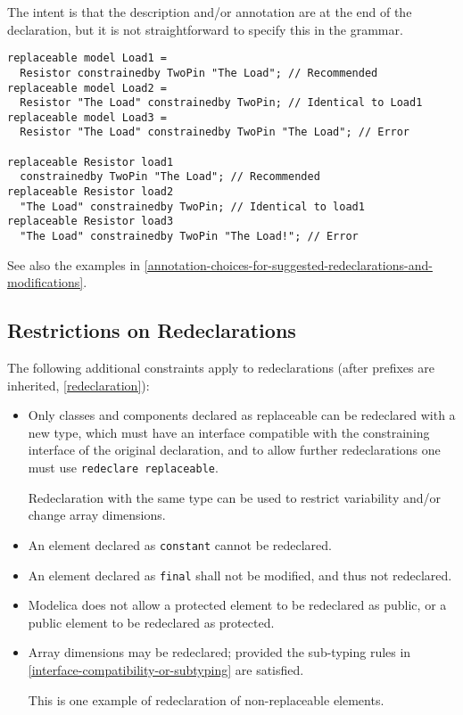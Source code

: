 \begin{nonnormative}
The intent is that the description and/or annotation are at the end of the declaration, but it is not straightforward to specify this in the grammar.
\end{nonnormative}

\begin{example}
\begin{lstlisting}[language=modelica]
replaceable model Load1 =
  Resistor constrainedby TwoPin "The Load"; // Recommended
replaceable model Load2 =
  Resistor "The Load" constrainedby TwoPin; // Identical to Load1
replaceable model Load3 =
  Resistor "The Load" constrainedby TwoPin "The Load"; // Error

replaceable Resistor load1
  constrainedby TwoPin "The Load"; // Recommended
replaceable Resistor load2
  "The Load" constrainedby TwoPin; // Identical to load1
replaceable Resistor load3
  "The Load" constrainedby TwoPin "The Load!"; // Error
\end{lstlisting}
\end{example}

See also the examples in \cref{annotation-choices-for-suggested-redeclarations-and-modifications}.


\subsection{Restrictions on Redeclarations}\label{restrictions-on-redeclarations}

The following additional constraints apply to redeclarations (after prefixes are inherited, \cref{redeclaration}):
\begin{itemize}
\item
  Only classes and components declared as replaceable can be redeclared with a new type, which must have an interface compatible with the constraining interface of the original declaration, and to allow further redeclarations one must use \lstinline!redeclare replaceable!.
  \begin{nonnormative}
  Redeclaration with the same type can be used to restrict variability and/or change array dimensions.
  \end{nonnormative}
\item
  An element declared as \lstinline!constant! cannot be redeclared.
\item
  An element declared as \lstinline!final! shall not be modified, and thus not redeclared.
\item
  Modelica does not allow a protected element to be redeclared as public, or a public element to be redeclared as protected.
\item
  Array dimensions may be redeclared; provided the sub-typing rules in \cref{interface-compatibility-or-subtyping} are satisfied.
  \begin{nonnormative}
  This is one example of redeclaration of non-replaceable elements.
  \end{nonnormative}
\end{itemize}


